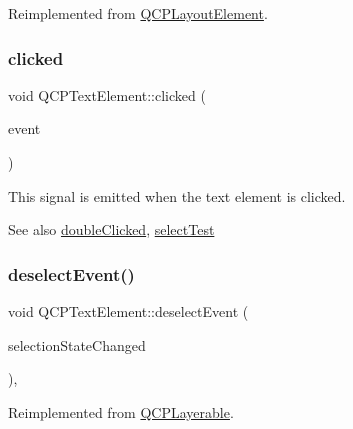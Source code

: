 Reimplemented from \mbox{\hyperlink{class_q_c_p_layout_element_a0a8f18141bcf46cf40ad4c13324ff346}{Q\+C\+P\+Layout\+Element}}.

\mbox{\label{class_q_c_p_text_element_ad2246a0e701c0655623f048737298334}} 
\subsubsection{\texorpdfstring{clicked}{clicked}}
{\footnotesize\ttfamily void Q\+C\+P\+Text\+Element\+::clicked (\begin{DoxyParamCaption}\item[{Q\+Mouse\+Event $\ast$}]{event }\end{DoxyParamCaption})\hspace{0.3cm}{\ttfamily [signal]}}

This signal is emitted when the text element is clicked.

\begin{DoxySeeAlso}{See also}
\mbox{\hyperlink{class_q_c_p_text_element_a9c6fd27ae8a7c3a02df7a6bbd3509e40}{double\+Clicked}}, \mbox{\hyperlink{class_q_c_p_text_element_a1e721bc2994a127ef5a8f0a514a5dbac}{select\+Test}} 
\end{DoxySeeAlso}
\mbox{\label{class_q_c_p_text_element_a9a631a9deb9d82089a9d52de1744accf}} 
\subsubsection{\texorpdfstring{deselectEvent()}{deselectEvent()}}
{\footnotesize\ttfamily void Q\+C\+P\+Text\+Element\+::deselect\+Event (\begin{DoxyParamCaption}\item[{bool $\ast$}]{selection\+State\+Changed }\end{DoxyParamCaption})\hspace{0.3cm}{\ttfamily [protected]}, {\ttfamily [virtual]}}



Reimplemented from \mbox{\hyperlink{class_q_c_p_layerable_ae546370644a5551c76af739afc008bee}{Q\+C\+P\+Layerable}}.

\mbox{\label{class_q_c_p_text_element_a9c6fd27ae8a7c3a02df7a6bbd3509e40}} 
